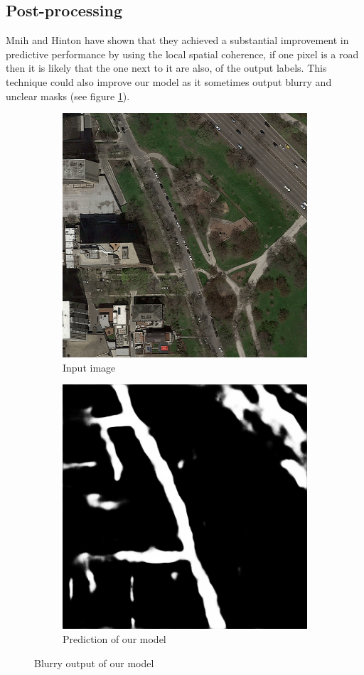 \documentclass[10pt,conference,compsocconf]{IEEEtran}
\begin{document}
\subsection{Post-processing}
Mnih and Hinton \cite{post_processing} have shown that they achieved a substantial improvement in predictive performance by using the local spatial coherence, if one pixel is a road then it is likely that the one next to it are also, of the output labels. This technique could also improve our model as it sometimes output blurry and unclear masks (see figure \ref{fig:blurry_output}).
\begin{figure}[ht]
    \centering
    \begin{subfigure}{0.45\linewidth}
        \centering
        \includegraphics[width=0.65\linewidth]{doc/images/blurry_input.png}
        \caption{Input image}
    \end{subfigure}
    \begin{subfigure}{0.45\linewidth}
        \centering
        \includegraphics[width=0.65\linewidth]{images/blurry_output.png}
        \caption{Prediction of our model}
    \end{subfigure}
    \caption{Blurry output of our model}
    \label{fig:blurry_output}
\end{figure}
\end{document}
